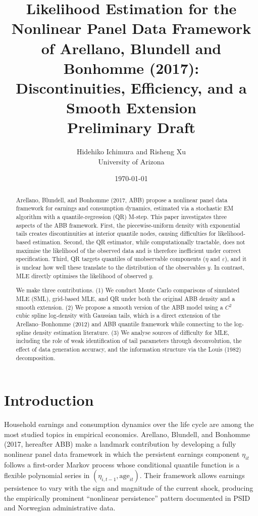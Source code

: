 \documentclass[12pt]{article}
\title{\textbf{Likelihood Estimation for the Nonlinear Panel Data Framework\\
of Arellano, Blundell and Bonhomme (2017):\\
Discontinuities, Efficiency, and a Smooth Extension}\\[0.6em]
\large Preliminary Draft}
\author{Hidehiko Ichimura and Risheng Xu\\
University of Arizona}
\date{\today}
\begin{document}
\maketitle

\begin{abstract}
\noindent
Arellano, Blundell, and Bonhomme (2017, ABB) propose a nonlinear panel data
framework for earnings and consumption dynamics, estimated via a stochastic EM
algorithm with a quantile-regression (QR) M-step.
This paper investigates three aspects of the ABB framework.
First, the piecewise-uniform density with exponential tails creates
discontinuities at interior quantile nodes, causing difficulties for
likelihood-based estimation.
Second, the QR estimator, while computationally tractable, does not maximise
the likelihood of the observed data and is therefore inefficient under correct
specification.
Third, QR targets quantiles of unobservable components ($\eta$ and
$\varepsilon$), and it is unclear how well these translate to the distribution
of the observables $y$.
In contrast, MLE directly optimises the likelihood of observed $y$.

We make three contributions.
(1) We conduct Monte Carlo comparisons of simulated MLE (SML), grid-based MLE,
and QR under both the original ABB density and a smooth extension.
(2) We propose a smooth version of the ABB model using a $C^2$ cubic spline
log-density with Gaussian tails, which is a direct extension of the
Arellano--Bonhomme (2012) and ABB quantile framework while connecting to the
log-spline density estimation literature.
(3) We analyse sources of difficulty for MLE, including the role of
weak identification of tail parameters through deconvolution, the effect of
data generation accuracy, and the information structure via the Louis (1982)
decomposition.
\end{abstract}

\newpage
\tableofcontents
\newpage

\section{Introduction}
\label{sec:intro}

Household earnings and consumption dynamics over the life cycle are among the
most studied topics in empirical economics.
Arellano, Blundell, and Bonhomme (2017, hereafter ABB) make a landmark
contribution by developing a fully nonlinear panel data framework in which the
persistent earnings component $\eta_{it}$ follows a first-order Markov process
whose conditional quantile function is a flexible polynomial series in
$(\eta_{i,t-1}, \text{age}_{it})$.
Their framework allows earnings persistence to vary with the sign and magnitude
of the current shock, producing the empirically prominent ``nonlinear
persistence'' pattern documented in PSID and Norwegian administrative data.
\end{document}
